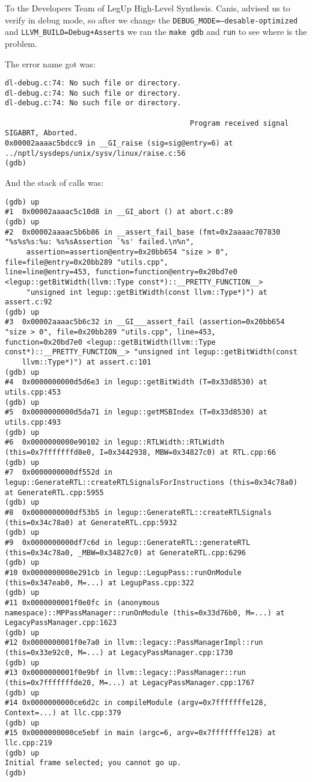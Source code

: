 \documentclass[11pt]{letter}
\begin{document}
\begin{letter}{To the Developers Team of LegUp High-Level Synthesis.}
Canis, advised us to verify in debug mode, so after we change the \texttt{DEBUG\_MODE=--desable-optimized} and \texttt{LLVM\_BUILD=Debug+Asserts} we ran the \texttt{make gdb} and \texttt{run} to see where is the problem. 

The error name got was:

{ \tiny
\begin{verbatim}
dl-debug.c:74: No such file or directory.
dl-debug.c:74: No such file or directory.
dl-debug.c:74: No such file or directory.

                                           Program received signal SIGABRT, Aborted.
0x00002aaaac5bdcc9 in __GI_raise (sig=sig@entry=6) at ../nptl/sysdeps/unix/sysv/linux/raise.c:56
(gdb)
\end{verbatim}
}

And the stack of calls was:

{ \tiny
\begin{verbatim}
(gdb) up
#1  0x00002aaaac5c10d8 in __GI_abort () at abort.c:89
(gdb) up
#2  0x00002aaaac5b6b86 in __assert_fail_base (fmt=0x2aaaac707830 "%s%s%s:%u: %s%sAssertion `%s' failed.\n%n",
     assertion=assertion@entry=0x20bb654 "size > 0", file=file@entry=0x20bb289 "utils.cpp",
line=line@entry=453, function=function@entry=0x20bd7e0 <legup::getBitWidth(llvm::Type const*)::__PRETTY_FUNCTION__>
     "unsigned int legup::getBitWidth(const llvm::Type*)") at assert.c:92
(gdb) up
#3  0x00002aaaac5b6c32 in __GI___assert_fail (assertion=0x20bb654 "size > 0", file=0x20bb289 "utils.cpp", line=453,
function=0x20bd7e0 <legup::getBitWidth(llvm::Type const*)::__PRETTY_FUNCTION__> "unsigned int legup::getBitWidth(const 
    llvm::Type*)") at assert.c:101
(gdb) up
#4  0x0000000000d5d6e3 in legup::getBitWidth (T=0x33d8530) at utils.cpp:453
(gdb) up
#5  0x0000000000d5da71 in legup::getMSBIndex (T=0x33d8530) at utils.cpp:493
(gdb) up
#6  0x0000000000e90102 in legup::RTLWidth::RTLWidth (this=0x7fffffffd8e0, I=0x3442938, MBW=0x34827c0) at RTL.cpp:66
(gdb) up
#7  0x0000000000df552d in legup::GenerateRTL::createRTLSignalsForInstructions (this=0x34c78a0) at GenerateRTL.cpp:5955
(gdb) up
#8  0x0000000000df53b5 in legup::GenerateRTL::createRTLSignals (this=0x34c78a0) at GenerateRTL.cpp:5932
(gdb) up
#9  0x0000000000df7c6d in legup::GenerateRTL::generateRTL (this=0x34c78a0, _MBW=0x34827c0) at GenerateRTL.cpp:6296
(gdb) up
#10 0x0000000000e291cb in legup::LegupPass::runOnModule (this=0x347eab0, M=...) at LegupPass.cpp:322
(gdb) up
#11 0x0000000001f0e0fc in (anonymous namespace)::MPPassManager::runOnModule (this=0x33d76b0, M=...) at LegacyPassManager.cpp:1623
(gdb) up
#12 0x0000000001f0e7a0 in llvm::legacy::PassManagerImpl::run (this=0x33e92c0, M=...) at LegacyPassManager.cpp:1730
(gdb) up
#13 0x0000000001f0e9bf in llvm::legacy::PassManager::run (this=0x7fffffffde20, M=...) at LegacyPassManager.cpp:1767
(gdb) up
#14 0x0000000000ce6d2c in compileModule (argv=0x7fffffffe128, Context=...) at llc.cpp:379
(gdb) up
#15 0x0000000000ce5ebf in main (argc=6, argv=0x7fffffffe128) at llc.cpp:219
(gdb) up
Initial frame selected; you cannot go up.
(gdb)
\end{verbatim}
}


\end{letter}
\end{document}
